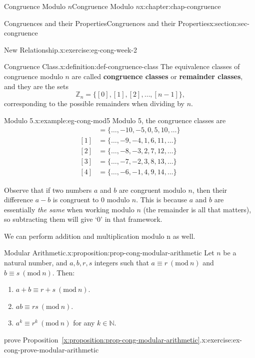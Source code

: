 \documentclass[oneside,10pt,]{book}
\newcommand{\xreffont}{\relax}
\newcommand{\terminology}[1]{\textbf{#1}}
\numberwithin{equation}{section}
\newcommand{\Mod}[1]{\ \left(\mathrm{mod}\ #1\right)}
\newcommand{\amp}{&}
\begin{document}
\begin{chapterptx}{Congruence Modulo \(n\)}{}{Congruence Modulo \(n\)}{}{}{x:chapter:chap-congruence}
\begin{sectionptx}{Congruences and their Properties}{}{Congruences and their Properties}{}{}{x:section:sec-congruence}
\begin{inlineexercise}{New Relationship.}{x:exercise:eg-cong-week-2}
\end{inlineexercise}
\begin{definition}{Congruence Class.}{x:definition:def-congruence-class}%
The equivalence classes of congruence modulo \(n\) are called \terminology{congruence classes} or \terminology{remainder classes}, and they are the sets%
\begin{equation*}
\mathbb{Z}_n = \{[0],[1],[2],\ldots,[n-1]\}\text{,}
\end{equation*}
corresponding to the possible remainders when dividing by \(n\). \label{g:notation:id430753}%
\end{definition}
\begin{example}{Modulo 5.}{x:example:eg-cong-mod5}%
Modulo 5, the congruence classes are%
\begin{align*}
[0] \amp = \{\ldots,-10,-5,0,5,10,\ldots\}\\
[1] \amp = \{\ldots,-9,-4,1,6,11,\ldots\}\\
[2] \amp = \{\ldots,-8,-3,2,7,12,\ldots\}\\
[3] \amp = \{\ldots,-7,-2,3,8,13,\ldots\}\\
[4] \amp = \{\ldots,-6,-1,4,9,14,\ldots\}
\end{align*}
%
\end{example}
Observe that if two numbers \(a\) and \(b\) are congruent modulo \(n\), then their difference \(a-b\) is congruent to 0 modulo \(n\). This is because \(a\) and \(b\) are essentially \emph{the same} when working modulo \(n\) (the remainder is all that matters), so subtracting them will give `0' in that framework.%
\par
We can perform addition and multiplication modulo \textdollar{}n\textdollar{} as well.%
\begin{proposition}{Modular Arithmetic.}{}{x:proposition:prop-cong-modular-arithmetic}%
Let \(n\) be a natural number, and \(a, b, r, s\) integers such that \(a \equiv r \Mod{n}\) and \(b \equiv s \Mod{n}\). Then:%
\begin{enumerate}[label=(\alph*)]
\item{}\(a + b \equiv r + s \Mod{n}\).%
\item{}\(ab \equiv rs \Mod{n}\).%
\item{}\(a^k \equiv r^k \Mod{n}\) for any \(k \in \mathbb{N}\).%
\end{enumerate}
%
\end{proposition}
\begin{inlineexercise}{prove Proposition~{\xreffont\ref*{x:proposition:prop-cong-modular-arithmetic}}.}{x:exercise:ex-cong-prove-modular-arithmetic}%

\end{inlineexercise}
\end{sectionptx}
\end{chapterptx}
\end{document}

